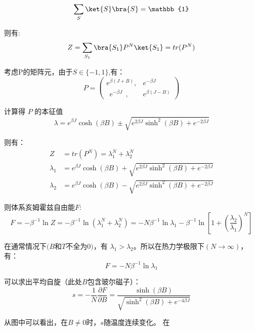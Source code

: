 \begin{equation}
\sum_S\ket{S}\bra{S}=\mathbb{1}
\end{equation}

则有:
\begin{equation}
Z=\sum\limits_{S_1}\bra{S_1}P^N\ket{S_1}=tr(P^N)
\end{equation}

考虑P的矩阵元，由于$S\in\{-1,1\}$,有：
$$P=\begin{pmatrix}
e^{\beta(J+B)},&e^{-\beta J} \\
~~e^{-\beta J}~~, & e^{\beta(J-B)}
\end{pmatrix}$$

计算得 $P$ 的本征值
$$\lambda=e^{\beta J}\cosh{(\beta B)}\pm \sqrt{e^{2\beta J }\sinh^2{(\beta B)}+e^{-2\beta J }}$$

则有：
\begin{align}
Z&=tr(P^N)=\lambda_1^N+\lambda_2^N \\
\lambda_1&=e^{\beta J}\cosh{(\beta B)}+ \sqrt{e^{2\beta J }\sinh^2{(\beta B)}+e^{-2\beta J }} \\
\lambda_2&=e^{\beta J}\cosh{(\beta B)}- \sqrt{e^{2\beta J }\sinh^2{(\beta B)}+e^{-2\beta J }}
\end{align}

则体系亥姆霍兹自由能$F$:
$$F=-\beta^{-1}\ln{Z}=-\beta^{-1}\ln{(\lambda_1^N+\lambda_2^N)}=-N\beta^{-1}\ln{\lambda_1}-\beta^{-1}\ln[1+(\frac{\lambda_2}{\lambda_1})^N]$$

在通常情况下$(B$和$T$不全为$0)$，有 $\lambda_1>\lambda_2$。所以在热力学极限下$(N\rightarrow\infty)$，有：
$$F=-N\beta^{-1}\ln{\lambda_1}$$

可以求出平均自旋（此处$B$包含玻尔磁子）：
$$s=-\frac{1}{N}\frac{\partial F}{\partial B}=\frac{\sinh(\beta B)}{\sqrt{\sinh^2(\beta B)+e^{-4\beta J}}}$$


从图中可以看出，在$B\neq 0$时，$s$随温度连续变化。
在






